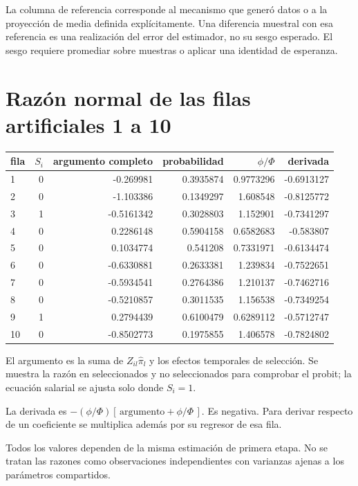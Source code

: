 \documentclass[11pt,a4paper]{article}
\begin{document}
La columna de referencia corresponde al mecanismo que generó datos o a la proyección de media definida explícitamente. Una diferencia muestral con esa referencia es una realización del error del estimador, no su sesgo esperado. El sesgo requiere promediar sobre muestras o aplicar una identidad de esperanza.

\clearpage
\section{Razón normal de las filas artificiales 1 a 10}

\begin{center}\small
\begin{tabular}{lrrrrr}
\toprule
fila & $S_i$ & argumento completo & probabilidad & $\phi/\Phi$ & derivada\\\midrule
1 & 0 & -0.269981 & 0.3935874 & 0.9773296 & -0.6913127\\
2 & 0 & -1.103386 & 0.1349297 & 1.608548 & -0.8125772\\
3 & 1 & -0.5161342 & 0.3028803 & 1.152901 & -0.7341297\\
4 & 0 & 0.2286148 & 0.5904158 & 0.6582683 & -0.583807\\
5 & 0 & 0.1034774 & 0.541208 & 0.7331971 & -0.6134474\\
6 & 0 & -0.6330881 & 0.2633381 & 1.239834 & -0.7522651\\
7 & 0 & -0.5934541 & 0.2764386 & 1.210137 & -0.7462716\\
8 & 0 & -0.5210857 & 0.3011535 & 1.156538 & -0.7349254\\
9 & 1 & 0.2794439 & 0.6100479 & 0.6289112 & -0.5712747\\
10 & 0 & -0.8502773 & 0.1975855 & 1.406578 & -0.7824802\\
\bottomrule
\end{tabular}\end{center}

El argumento es la suma de $Z_{il}\widehat\pi_l$ y los efectos temporales de selección. Se muestra la razón en seleccionados y no seleccionados para comprobar el probit; la ecuación salarial se ajusta solo donde $S_i=1$.

La derivada es $-(\phi/\Phi)[\,\text{argumento}+\phi/\Phi\,]$. Es negativa. Para derivar respecto de un coeficiente se multiplica además por su regresor de esa fila.

Todos los valores dependen de la misma estimación de primera etapa. No se tratan las razones como observaciones independientes con varianzas ajenas a los parámetros compartidos.
\end{document}
